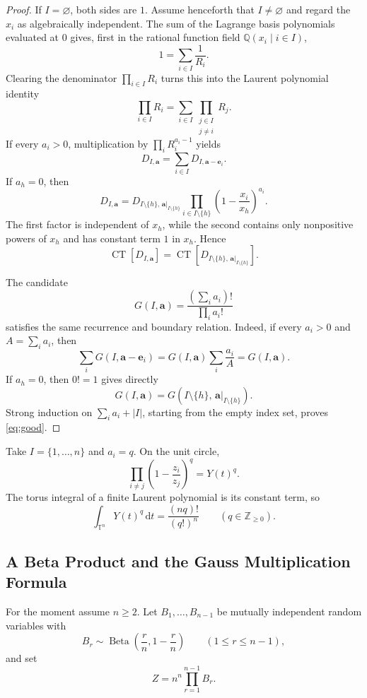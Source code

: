 \documentclass[11pt,a4paper]{article}
\theoremstyle{definition}
\newcommand{\CT}{\operatorname{CT}}
\newcommand{\T}{\mathbb T}
\newcommand{\Q}{\mathbb Q}
\newcommand{\dd}{\,\mathrm d}
\begin{document}
\begin{proof}
If $I=\varnothing$, both sides are $1$. Assume henceforth that
$I\ne\varnothing$ and regard the $x_i$ as algebraically independent.
The sum of the Lagrange basis polynomials evaluated at $0$ gives, first
in the rational function field $\Q(x_i\mid i\in I)$,
\[
 1=\sum_{i\in I}\frac1{R_i}.
\]
Clearing the denominator $\prod_{i\in I}R_i$ turns this into the Laurent
polynomial identity
\[
 \prod_{i\in I}R_i
 =\sum_{i\in I}\prod_{\substack{j\in I\\j\ne i}}R_j.
\]
If every $a_i>0$, multiplication by $\prod_iR_i^{a_i-1}$ yields
\begin{equation}\label{eq:good-rec}
 D_{I,\bm a}=\sum_{i\in I}D_{I,\bm a-\bm e_i}.
\end{equation}
If $a_h=0$, then
\[
D_{I,\bm a}
=D_{I\setminus\{h\},\,\bm a|_{I\setminus\{h\}}}
\prod_{i\in I\setminus\{h\}}
\left(1-\frac{x_i}{x_h}\right)^{a_i}.
\]
The first factor is independent of $x_h$, while the second contains only
nonpositive powers of $x_h$ and has constant term $1$ in $x_h$. Hence
\begin{equation}\label{eq:good-boundary}
\CT[D_{I,\bm a}]
=\CT[D_{I\setminus\{h\},\,\bm a|_{I\setminus\{h\}}}].
\end{equation}

The candidate
\[
G(I,\bm a)=\frac{(\sum_i a_i)!}{\prod_i a_i!}
\]
satisfies the same recurrence and boundary relation. Indeed, if every
$a_i>0$ and $A=\sum_i a_i$, then
\[
\sum_iG(I,\bm a-\bm e_i)
=G(I,\bm a)\sum_i\frac{a_i}{A}=G(I,\bm a).
\]
If $a_h=0$, then $0!=1$ gives directly
\[
 G(I,\bm a)
 =G(I\setminus\{h\},\,\bm a|_{I\setminus\{h\}}).
\]
Strong induction on $\sum_i a_i+|I|$, starting from the empty index set,
proves \eqref{eq:good}.
\end{proof}

Take $I=\{1,\ldots,n\}$ and $a_i=q$. On the unit circle,
\[
\prod_{i\ne j}\left(1-\frac{z_i}{z_j}\right)^q=Y(t)^q.
\]
The torus integral of a finite Laurent polynomial is its constant term,
so
\begin{equation}\label{eq:Y-integer-moments}
\int_{\T^n}Y(t)^q\dd t=\frac{(nq)!}{(q!)^n}
\qquad(q\in\mathbb Z_{\ge0}).
\end{equation}

\subsection{A Beta Product and the Gauss Multiplication Formula}

For the moment assume $n\ge2$. Let $B_1,\ldots,B_{n-1}$ be mutually
independent random variables with
\[
B_r\sim\operatorname{Beta}\left(\frac rn,1-\frac rn\right)
\qquad(1\le r\le n-1),
\]
and set
\begin{equation}\label{eq:Z}
 Z=n^n\prod_{r=1}^{n-1}B_r.
\end{equation}
\end{document}
